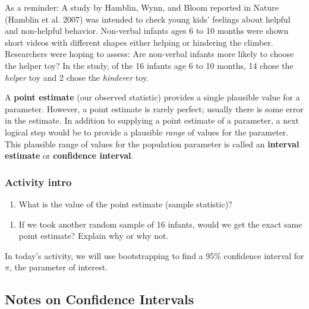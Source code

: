 \documentclass[
]{report}
\providecommand{\tightlist}{%
  \setlength{\itemsep}{0pt}\setlength{\parskip}{0pt}}
\begin{document}
As a reminder: A study by Hamblin, Wynn, and Bloom reported in Nature (Hamblin et al. 2007) was intended to check young kids' feelings about helpful and non-helpful behavior. Non-verbal infants ages 6 to 10 months were shown short videos with different shapes either helping or hindering the climber. Researchers were hoping to assess: Are non-verbal infants more likely to choose the helper toy? In the study, of the 16 infants age 6 to 10 months, 14 chose the \emph{helper} toy and 2 chose the \emph{hinderer} toy.

A \textbf{point estimate} (our observed statistic) provides a single plausible value for a parameter. However, a point estimate is rarely perfect; usually there is some error in the estimate. In addition to supplying a point estimate of a parameter, a next logical step would be to provide a plausible \emph{range} of values for the parameter. This plausible range of values for the population parameter is called an \textbf{interval estimate} or \textbf{confidence interval}.

\subsubsection*{Activity intro}\label{activity-intro}

\begin{enumerate}
\def\labelenumi{\arabic{enumi}.}
\tightlist
\item
  What is the value of the point estimate (sample statistic)?
\end{enumerate}

\vspace{0.3in}

\begin{enumerate}
\def\labelenumi{\arabic{enumi}.}
\setcounter{enumi}{1}
\tightlist
\item
  If we took another random sample of 16 infants, would we get the exact same point estimate? Explain why or why not.
\end{enumerate}

\vspace{0.5in}

In today's activity, we will use bootstrapping to find a 95\% confidence interval for \(\pi\), the parameter of interest.

\subsection*{Notes on Confidence Intervals}\label{notes-on-confidence-intervals}
\end{document}
